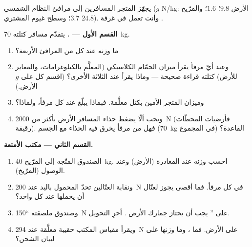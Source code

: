 \begin{problem}\label{pb:g9:weight-vs-mass:1}
يجهّز المتجر المسافرين إلى مرافئ النظام الشمسي ($g$ 
\unit{N/kg}: الأرض $9.8$؛  $1.6$؛ والمرّيخ $3.7$؛ وسطح
غيوم المشتري $24.8$). وأنت تعمل في غرفة .

\medskip\noindent\textbf{القسم الأول --- .}
يتقدّم مسافر كتلته \qty{70}{kg}.
\begin{enumerate}
  \item ما وزنه عند كل من المرافئ الأربعة؟
  \item وعند أيّ مرفأ يقرأ ميزان الحمّام الكلاسيكي (المعلَّم
        بالكيلوغرامات، والمعاير للأرض) كتلته قراءة صحيحة ---
        وماذا يقرأ عند الثلاثة الأخرى؟ (اقسم كل  على $g$
        الأرض.)
  \item وميزان المتجر الأمين  بكتل معلَّمة. فبماذا
        يبلّغ عند كل مرفأ، ولماذا؟
  \item ويجب ألّا يضغط حذاء المسافر الأرض بأكثر من
        \qty{2000}{N} (فأرضيات المحطّات رقيقة). فهل من مرفأ
        يخرق فيه الحذاء مع الجسم (\qty{70}{kg} في المجموع)
        القاعدة؟
\end{enumerate}

\medskip\noindent\textbf{القسم الثاني --- مكتب الأمتعة.}
\begin{enumerate}[resume]
  \item {} الصندوق المتّجه إلى المرّيخ \qty{40}{kg}. احسب
        وزنه عند المغادرة (الأرض) وعند الوصول (المرّيخ).
  \item ونقابة العتّالين تحدّ \emph{} المحمول باليد
        عند \qty{200}{N} في كل مرفأ. فما أقصى \emph{}
        يجوز لعتّال أن يحملها عند كل واحد؟
  \item وصندوق ملصقته ``\qty{150}{N} على '' يجب أن يجتاز
        جمارك الأرض . أجرِ التحويل.
  \item ويقرأ مقياس  المكتب حقيبة معلَّقة عند \qty{294}{N}
        على الأرض. فما ، وما وزنها على  لبيان
        الشحن؟
\end{enumerate}


\end{problem}
